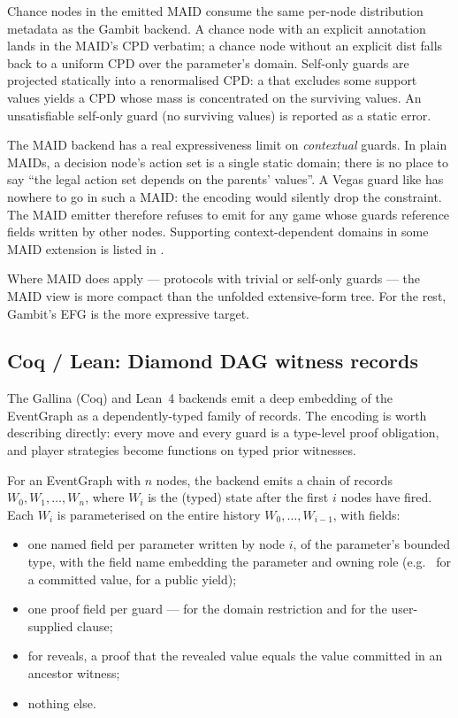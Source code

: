 Chance nodes in the emitted MAID consume the same per-node
distribution metadata as the Gambit backend.  A chance node with
an explicit  annotation lands in the
MAID's CPD verbatim; a chance node without an explicit dist falls
back to a uniform CPD over the parameter's domain.  Self-only
guards are projected statically into a renormalised CPD: a
 that excludes some support values yields a CPD whose
mass is concentrated on the surviving values.  An unsatisfiable
self-only guard (no surviving values) is reported as a static
error.

The MAID backend has a real expressiveness limit on
\emph{contextual} guards.  In plain MAIDs, a decision node's
action set is a single static domain; there is no place to say
``the legal action set depends on the parents' values''.  A
Vegas guard like  has nowhere to
go in such a MAID: the encoding would silently drop the
constraint.  The MAID emitter therefore refuses to emit for any
game whose guards reference fields written by other nodes.
Supporting context-dependent domains in some MAID extension is
listed in .

Where MAID does apply --- protocols with trivial or self-only
guards --- the MAID view is more compact than the unfolded
extensive-form tree.  For the rest, Gambit's EFG is the more
expressive target.

\subsection{Coq / Lean: Diamond DAG witness records}
\label{sec:other:diamond}

The Gallina (Coq) and Lean~4 backends emit a deep embedding of
the EventGraph as a dependently-typed family of records.  The
encoding is worth describing directly: every move and every
guard is a type-level proof obligation, and player strategies
become functions on typed prior witnesses.

For an EventGraph with $n$ nodes, the backend emits a chain of
records $W_0, W_1, \dots, W_n$, where $W_i$ is the (typed) state
after the first $i$ nodes have fired.  Each $W_i$ is parameterised
on the entire history $W_0, \dots, W_{i-1}$, with fields:

\begin{itemize}\itemsep1pt
\item one named field per parameter written by node $i$, of the
  parameter's bounded type, with the field name embedding the
  parameter and owning role (e.g.\  for a
  committed value,  for a public yield);
\item one proof field per guard ---
   for the domain restriction
  and  for the user-supplied 
  clause;
\item for reveals, a proof
   that the revealed value
  equals the value committed in an ancestor witness;
\item nothing else.
\end{itemize}

